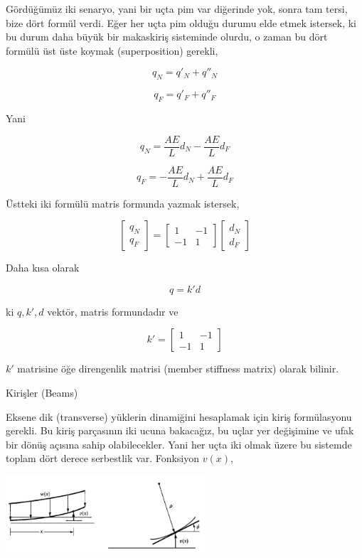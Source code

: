 \documentclass[12pt,fleqn]{article}\usepackage{../../common}
\begin{document}
Gördüğümüz iki senaryo, yani bir uçta pim var diğerinde yok, sonra tam tersi,
bize dört formül verdi. Eğer her uçta pim olduğu durumu elde etmek istersek, ki
bu durum daha büyük bir makaskiriş sisteminde olurdu, o zaman bu dört formülü
üst üste koymak (superposition) gerekli,

$$
q_N = q'_N + q''_N 
$$

$$
q_F = q'_F + q''_F
$$

Yani

$$
q_N = \frac{AE}{L} d_N - \frac{AE}{L} d_F
$$

$$
q_F = -\frac{AE}{L} d_N + \frac{AE}{L} d_F
$$

Üstteki iki formülü matris formunda yazmak istersek,

$$
\left[\begin{array}{c}
q_N \\ q_F
\end{array}\right] =
\left[\begin{array}{cc}
1 & -1 \\ -1 & 1
\end{array}\right]
\left[\begin{array}{c}
d_N \\ d_F
\end{array}\right] 
$$

Daha kısa olarak

$$
q = k' d
$$

ki $q,k',d$ vektör, matris formundadır ve

$$
k' = \left[\begin{array}{cc}
1 & -1 \\ -1 & 1
\end{array}\right]
$$

$k'$ matrisine öğe direngenlik matrisi (member stiffness matrix) olarak bilinir.

Kirişler (Beams)

Eksene dik (transverse) yüklerin dinamiğini hesaplamak için kiriş formülasyonu
gerekli. Bu kiriş parçasının iki ucuna bakacağız, bu uçlar yer değişimine ve
ufak bir dönüş açısına sahip olabilecekler. Yani her uçta iki olmak üzere
bu sistemde toplam dört derece serbestlik var. Fonksiyon $v(x)$,

\includegraphics[width=20em]{phy_020_strs_05_09.jpg}
\end{document}
